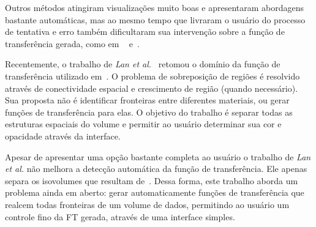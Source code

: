 	Outros métodos atingiram visualizações muito boas e apresentaram abordagens bastante automáticas, mas ao mesmo tempo que livraram o usuário do processo de tentativa e erro também dificultaram sua intervenção sobre a função de transferência gerada, como em ~\cite{ruiz} e~\cite{zhou}.
	
	Recentemente, o trabalho de \textit{Lan et al.}~\cite{lan} retomou o domínio da função de transferência utilizado em~\cite{gordon}. O problema de sobreposição de regiões é resolvido através de conectividade espacial e crescimento de região (quando necessário). Sua proposta não é identificar fronteiras entre diferentes materiais, ou gerar funções de transferência para elas. O objetivo do trabalho é separar todas as estruturas espaciais do volume e permitir ao usuário determinar sua cor e opacidade através da interface. 
	
	Apesar de apresentar uma opção bastante completa ao usuário o trabalho de \textit{Lan et al.} não melhora a detecção automática da função de transferência. Ele apenas separa os isovolumes que resultam de~\cite{gordon, kniss1, kniss2}. Dessa forma, este trabalho aborda um problema ainda em aberto: gerar automaticamente funções de transferência que realcem todas fronteiras de um volume de dados, permitindo ao usuário um controle fino da FT gerada, através de uma interface simples.
